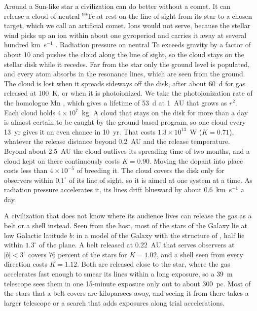 \documentclass[final,5p]{elsarticle}
\begin{document}
Around a Sun-like star a civilization can do better without a comet. It can release a cloud of neutral $^{99}$Tc at rest on the line of sight from its star to a chosen target, which we call an artificial comet. Ions would not serve, because the stellar wind picks up an ion within about one gyroperiod \citep{Gaffey1988} and carries it away at several hundred km~s$^{-1}$ \citep{Woch1997}. Radiation pressure on neutral Tc exceeds gravity by a factor of about 10 and pushes the cloud along the line of sight, so the cloud stays on the stellar disk while it recedes. Far from the star only the ground level is populated, and every atom absorbs in the  resonance lines, which are seen from the ground. The cloud is lost when it spreads sideways off the disk, after about 60~d for gas released at 100~K, or when it is photoionized. We take the photoionization rate of the homologue Mn \citep{Heays2017}, which gives a lifetime of 53~d at 1~AU that grows as $r^{2}$. Each cloud holds $4\times10^{7}$~kg. A cloud that stays on the disk for more than a day is almost certain to be caught by the ground-based program, so one cloud every 13~yr gives it an even chance in 10~yr. That costs $1.3\times10^{13}$~W ($K = 0.71$), whatever the release distance beyond 0.2~AU and the release temperature. Beyond about 2.5~AU the cloud outlives its spreading time of two months, and a cloud kept on there continuously costs $K = 0.90$. Moving the dopant into place costs less than $4\times10^{-5}$ of breeding it. The cloud covers the disk only for observers within $0.1^\circ$ of its line of sight, so it is aimed at one system at a time. As radiation pressure accelerates it, its lines drift blueward by about 0.6~km~s$^{-1}$ a day.

A civilization that does not know where its audience lives can release the gas as a belt or a shell instead. Seen from the host, most of the stars of the Galaxy lie at low Galactic latitude $b$: in a model of the Galaxy with the structure of \citet{BlandHawthorn2016}, half lie within $1.3^\circ$ of the plane. A belt released at 0.22~AU that serves observers at $|b| < 3^\circ$ covers 76 percent of the stars for $K = 1.02$, and a shell seen from every direction costs $K = 1.12$. Both are released close to the star, where the gas accelerates fast enough to smear its lines within a long exposure, so a 39~m telescope sees them in one 15-minute exposure only out to about 300~pc. Most of the stars that a belt covers are kiloparsecs away, and seeing it from there takes a larger telescope or a search that adds exposures along trial accelerations.
\end{document}
